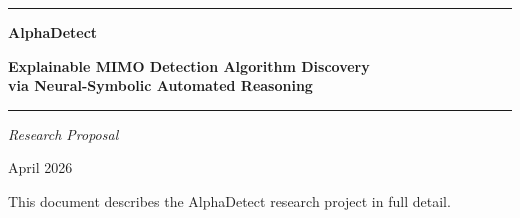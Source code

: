 \documentclass[12pt,a4paper]{article}
\begin{document}
\begin{titlepage}
  \thispagestyle{empty}
  \centering
  \vspace*{1.5cm}
  {\color{myblue}\rule{\linewidth}{1.5pt}}\vspace{0.5em}

  {\Huge\bfseries\color{myblue} AlphaDetect}\vspace{0.4em}

  {\Large\bfseries Explainable MIMO Detection Algorithm Discovery\\
  via Neural-Symbolic Automated Reasoning}\vspace{0.5em}

  {\color{myblue}\rule{\linewidth}{1.5pt}}\vspace{2em}

  {\large\textit{Research Proposal}}\vspace{1em}

  {\normalsize April 2026}\vspace{3cm}

  \begin{abstract}
    \noindent
    We propose \textbf{AlphaDetect}, a unified framework for the automated
    discovery of explainable MIMO detection algorithms. AlphaDetect grounds
    algorithm discovery in \emph{formal reasoning} through four tightly
    integrated components: (i)~a Typed Domain-Specific Language (DSL) that
    encodes signal-processing and probabilistic-inference primitives with
    precise mathematical types and algorithmic combinators; (ii)~a Problem
    Transformation Library that recasts the invention of intermediate concepts
    as witness generation from typed transformations; (iii)~a Computer Algebra
    System (CAS) that performs step-by-step symbolic derivation of algorithm
    update equations; and (iv)~a Structure Mapping Engine (SME) augmented with
    LLM-generated predicate representations for cross-domain conceptual
    transfer. Together, these components address the central challenge of
    algorithm discovery---the invention of novel \emph{intermediate concepts}
    (e.g., recognising a MIMO model as a factor graph, or introducing a cavity
    distribution) that cannot be reduced to search over a fixed concept space.
    We present the complete system architecture, detail every component and its
    implementation, and demonstrate through case studies (EP-MIMO, GTA,
    BP-guided sphere decoding) how known algorithms can be re-derived within
    this framework.
  \end{abstract}

  \vfill
  {\color{gray}\small This document describes the AlphaDetect research project
  in full detail.}
\end{titlepage}
\end{document}
